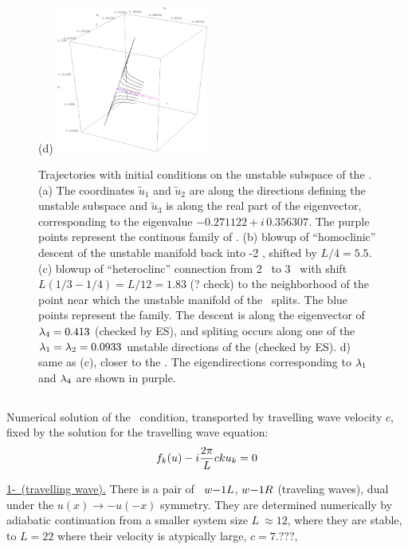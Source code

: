 \begin{figure}[h]
\hspace{0.1in}
(d)  \includegraphics[width=5.0cm]{figs/L22-2w-3w-detail.eps}
\caption{
 Trajectories with initial conditions on the unstable subspace of
 the  {\eqva}.
 (a) The coordinates $\tilde{u}_1$ and $\tilde{u}_2$ are along the directions defining the unstable subspace
 and $\tilde{u}_3$  is along the real part of the eigenvector,
 corresponding to the eigenvalue $-0.271122+ i\, 0.356307$. The purple points represent the continous family
 of
 \eqva.
(b) blowup of ``homoclinic'' descent of the unstable manifold
back into {\nameit}-2 {\eqv}, shifted by
$L/4 =5.5$.
(c) blowup of ``heteroclinc'' connection from
{\nameit}2 \eqv\ to {\nameit}3 \eqv\, with shift
$L(1/3-1/4) = L/12 = 1.83$ (? check)
to the neighborhood of the point near which the
unstable manifold of the
 \eqv\ splits. The blue points
represent the
 {\eqv} family.
The descent is along the eigenvector of $\lambda_4= 0.413$ (checked by ES),
and spliting
occurs along one of the
$\lambda_1=\lambda_2=0.0933$
unstable directions of the  {\eqv} (checked by ES).
d) same as (c), closer to the  {\eqv}. The eigendirections corresponding to $\lambda_1$
and $\lambda_4$ are shown in purple.
}
\label{f:neighborhood2w}
\end{figure}


\subsection{\Reqva}

Numerical solution of the \reqv\  condition,
transported by travelling wave velocity $c$,
fixed by the solution for the travelling wave equation:
\[
f_k(u) - i{2\pi\over L} c k u_k = 0
\]

\underline{1-\reqv\  (travelling wave).}
There is a pair of \reqva\
${w-}1L$,
${w-}1R$
(traveling waves), dual under the
$u(x) \to -u(-x)$ symmetry. They are
determined numerically by
adiabatic continuation from a smaller system size
$L~\approx 12$,
where they are stable, to $L=22$
where their velocity is atypically large, $c=7.???$,

